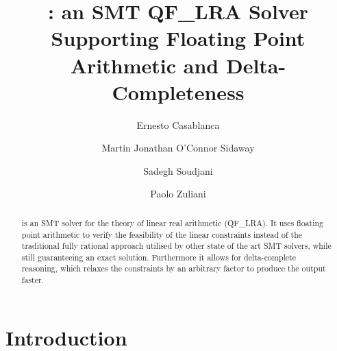\documentclass[runningheads]{llncs}
\begin{document}
\title{\dlinear: an SMT QF\_LRA Solver Supporting Floating Point Arithmetic and Delta-Completeness}
\titlerunning{\dlinear}

\author{Ernesto Casablanca
    \and
    Martin Jonathan O'Connor Sidaway
    \and
    Sadegh Soudjani
    \and
    Paolo Zuliani
}



\maketitle

\begin{abstract}
    \dlinear is an SMT solver for the theory of linear real arithmetic (QF\_LRA).
    It uses floating point arithmetic to verify the feasibility of the linear constraints instead of the traditional fully rational approach utilised by other state of the art SMT solvers,
    while still guaranteeing an exact solution.
    Furthermore it allows for delta-complete reasoning, which relaxes the constraints by an arbitrary factor to produce the output faster.

\end{abstract}

\section{Introduction}
\end{document}
